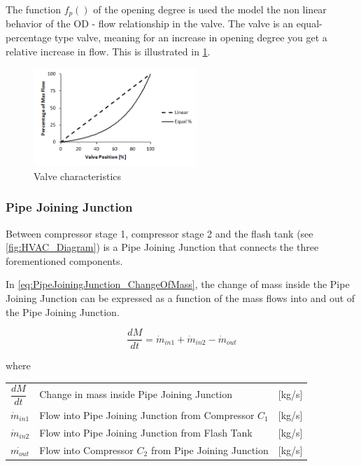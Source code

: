 The function $f_p()$ of the opening degree is used the model the non linear behavior of the OD - flow relationship in the valve. The valve is an equal-percentage type valve, meaning for an increase in opening degree you get a relative increase in flow. This is illustrated in \cref{fig:equal_percent_valve}.

\begin{figure}[h!]
	\centering
	\includegraphics[width=0.55\textwidth]{Graphics/Equal-percentage.png}
	\caption{Valve characteristics}
	\label{fig:equal_percent_valve}
\end{figure}


\subsubsection{Pipe Joining Junction}
Between compressor stage 1, compressor stage 2 and the flash tank (see \cref{fig:HVAC_Diagram}) is a Pipe Joining Junction that connects the three forementioned components.

In \cref{eq:PipeJoiningJunction_ChangeOfMass}, the change of mass inside the Pipe Joining Junction can be expressed as a function of the mass flows into and out of the Pipe Joining Junction.

\begin{equation} \label{eq:PipeJoiningJunction_ChangeOfMass}
	\frac{dM}{dt} = \dot{m}_{in1} + \dot{m}_{in2} - \dot{m}_{out}
\end{equation}


where

\begin{center}
	\begin{tabular}{l p{8cm} l}
		$\dfrac{dM}{dt}$ & Change in mass inside Pipe Joining Junction		 	& [\si{kg}/\si{s}]\\
		$\dot{m}_{in1}$ & Flow into Pipe Joining Junction from Compressor $ C_1 $ 		& [\si{kg}/\si{s}]\\
		$\dot{m}_{in2}$ & Flow into Pipe Joining Junction from Flash Tank 				& [\si{kg}/\si{s}]\\
		$\dot{m_{out}}$ & Flow into Compressor $ C_2 $ from Pipe Joining Junction		& [\si{kg}/\si{s}]\\
	\end{tabular}
\end{center}

